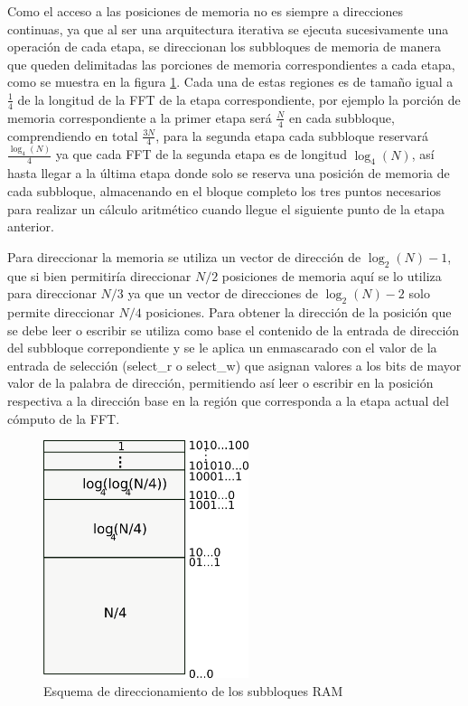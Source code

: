 Como el acceso a las posiciones de memoria no es siempre a direcciones continuas, ya que al ser una
arquitectura iterativa se ejecuta sucesivamente una operación de cada etapa, se direccionan los
subbloques de memoria de manera que queden delimitadas las porciones de memoria correspondientes a
cada etapa, como se muestra en la figura \ref{fig:tripleRamdir}. Cada una de estas regiones es de
tamaño igual a $\frac{1}{4}$ de la longitud de la FFT de la etapa correspondiente, por ejemplo la porción de memoria correspondiente a la primer etapa
será $\frac{N}{4}$ en cada subbloque, comprendiendo en total $\frac{3N}{4}$, para la segunda
etapa cada subbloque reservará $\frac{\log_4(N)}{4}$ ya que cada FFT de la segunda etapa es de
longitud $\log_4(N)$, así hasta llegar a la última etapa donde solo se reserva una posición de
memoria de cada subbloque, almacenando en el bloque completo los tres puntos necesarios para
realizar un cálculo aritmético cuando llegue el siguiente punto de la etapa
anterior.

Para direccionar la memoria se utiliza un vector de dirección de $\log_2(N)-1$, que si bien
permitiría direccionar $N/2$ posiciones de memoria aquí se lo utiliza para direccionar $N/3$ ya que
un vector de direcciones de $\log_2(N)-2$ solo permite direccionar $N/4$ posiciones.
Para obtener la dirección de la posición que se debe leer o escribir se utiliza como base el
contenido de la entrada de dirección del subbloque correpondiente y se le aplica un enmascarado con
el valor de la entrada de selección (select\_r o select\_w) que asignan valores a los bits de mayor
valor de la palabra de dirección, permitiendo así leer o escribir en la posición respectiva a la
dirección base en la región que corresponda a la etapa actual del cómputo de la FFT.

\begin{figure}[htb!]
        \centering
        \includegraphics[width=6cm]{./figures/tripleRAMdir.png}
        \caption{Esquema de direccionamiento de los subbloques RAM}
        \label{fig:tripleRamdir}
\end{figure}

